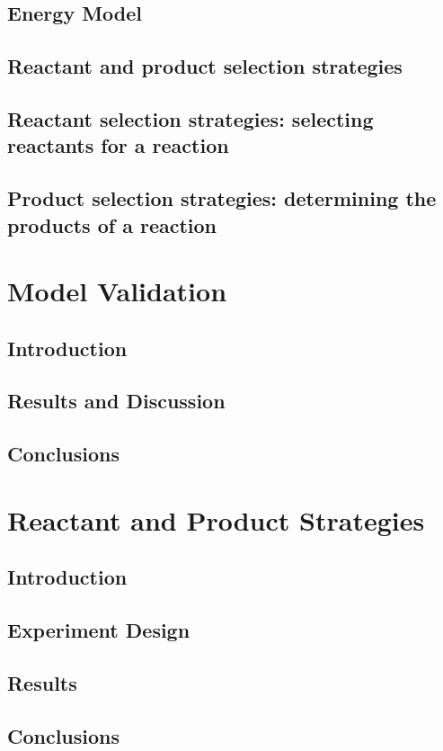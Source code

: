\documentclass[]{report}
\begin{document}
\section{Energy Model}
\section{Reactant and product selection strategies}
\section{Reactant selection strategies: selecting reactants for a reaction}
\section{Product selection strategies: determining the products of a reaction}

\chapter{Model Validation}
\section{Introduction}
\section{Results and Discussion}
\section{Conclusions}

\chapter{Reactant and Product Strategies}
\section{Introduction}
\section{Experiment Design}
\section{Results}
\section{Conclusions}
\end{document}
